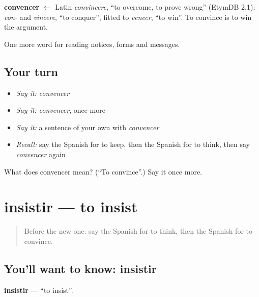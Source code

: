 \begin{cousinweb}
\textbf{convencer} $\leftarrow$ Latin \emph{convincere}, \textquotedblleft{}to overcome, to prove wrong\textquotedblright{} (EtymDB 2.1): \emph{con-} and \emph{vincere}, \textquotedblleft{}to conquer\textquotedblright{}, fitted to \emph{vencer}, \textquotedblleft{}to win\textquotedblright{}. To convince is to win the argument.
\end{cousinweb}

\begin{grammarlens}[title={What you've built}]
One more word for reading notices, forms and messages.
\end{grammarlens}

\subsection*{Your turn}
\begin{itemize}
\raggedright
  \item \emph{Say it:} \emph{convencer}
  \item \emph{Say it:} \emph{convencer}, once more
  \item \emph{Say it:} a sentence of your own with \emph{convencer}
  \item \emph{Recall:} say the Spanish for to keep, then the Spanish for to think, then say \emph{convencer} again
\end{itemize}

\begin{tcolorbox}[breakable,colback=teal!4,colframe=teal!35!black,title={Before you move on}]
What does convencer mean? (\textquotedblleft{}To convince\textquotedblright{}.) Say it once more.
\end{tcolorbox}
\section[insistir]{insistir — to insist}

\label{lesson:ES-C493-insistir}



\begin{quote}
Before the new one: say the Spanish for to think, then the Spanish for to convince.
\end{quote}

\subsection*{You'll want to know: insistir}
\textbf{insistir} — \textquotedblleft{}to insist\textquotedblright{}.

